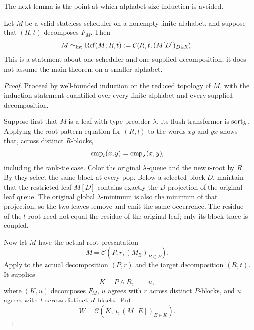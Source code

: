 The next lemma is the point at which alphabet-size induction is avoided.

\begin{lemma}
\label{lem:meet-promotion}
Let \(M\) be a valid stateless scheduler on a nonempty finite alphabet, and
suppose that \((R,t)\) decomposes \(F_M\).  Then
\begin{equation}
 M\mathrel{\simeq_{\mathrm{int}}} \operatorname{Ref}(M;R,t)
 :=\mathcal C(R,t,(M[D])_{D\in R}).
 \label{eq:meet-promotion}
\end{equation}
This is a statement about one scheduler and one supplied decomposition; it
does not assume the main theorem on a smaller alphabet.
\end{lemma}

\begin{proof}
Proceed by well-founded induction on the reduced topology of \(M\), with the
induction statement quantified over every finite alphabet and every supplied
decomposition.

Suppose first that \(M\) is a leaf with type preorder \(\lambda\).  Its flush
transformer is \(\operatorname{sort}_\lambda\).  Applying the root-pattern equation for
\((R,t)\) to the words \(xy\) and \(yx\) shows that, across distinct
\(R\)-blocks,
\begin{equation}
 \operatorname{cmp}_t(x,y)=\operatorname{cmp}_\lambda(x,y),
 \label{eq:leaf-promotion-interface}
\end{equation}
including the rank-tie case.  Color the original \(\lambda\)-queue and the
new \(t\)-root by \(R\).  By  they select the same block
at every pop.  Below a selected block \(D\), maintain that the restricted leaf
\(M[D]\) contains exactly the \(D\)-projection of the original leaf queue.
The original global \(\lambda\)-minimum is also the minimum of that
projection, so the two leaves remove and emit the same occurrence.  The
residue of the \(t\)-root need not equal the residue of the original leaf;
only its block trace is coupled.

Now let \(M\) have the actual root presentation
\begin{equation}
 M=\mathcal C(P,r,(M_B)_{B\in P}).
 \label{eq:promotion-actual-root}
\end{equation}
Apply  to the actual decomposition
\((P,r)\) and the target decomposition \((R,t)\).  It supplies
\begin{equation}
 K=P\wedge R,\qquad u,
 \label{eq:promotion-common-meet}
\end{equation}
where \((K,u)\) decomposes \(F_M\), \(u\) agrees with \(r\) across distinct
\(P\)-blocks, and \(u\) agrees with \(t\) across distinct \(R\)-blocks.  Put
\begin{equation}
 W=\mathcal C(K,u,(M[E])_{E\in K}).
 \label{eq:promotion-W}
\end{equation}


\end{proof}
